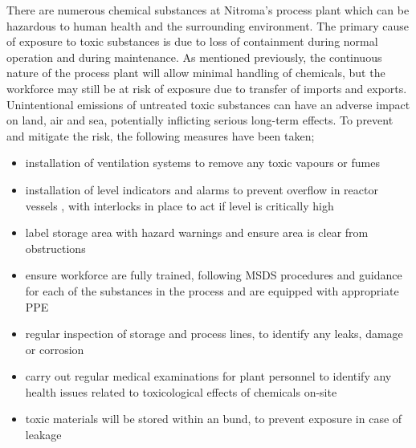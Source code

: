 There are numerous chemical substances at Nitroma's process plant which can be hazardous to human health and the surrounding environment. The primary cause of exposure to toxic substances is due to loss of containment during normal operation and during maintenance. As mentioned previously, the continuous nature of the process plant will allow minimal handling of chemicals, but the workforce may still be at risk of exposure due to transfer of imports and exports. Unintentional emissions of untreated toxic substances can have an adverse impact on land, air and sea, potentially inflicting serious long-term effects. To prevent and mitigate the risk, the following measures have been taken;

\begin{itemize}
    \item installation of ventilation systems to remove any toxic vapours or fumes 
    \item installation of level indicators and alarms to prevent overflow in reactor vessels , with interlocks in place to act if level is critically high
    \item label storage area with hazard warnings and ensure area is clear from obstructions
    \item ensure workforce are fully trained, following MSDS procedures and guidance for each of the substances in the process and are equipped with appropriate PPE 
    \item regular inspection of storage and process lines, to identify any leaks, damage or corrosion 
    \item carry out regular medical examinations for plant personnel to identify any health issues related to toxicological effects of chemicals on-site
\item toxic materials will be stored within an bund, to prevent exposure in case of leakage 
\end{itemize}



